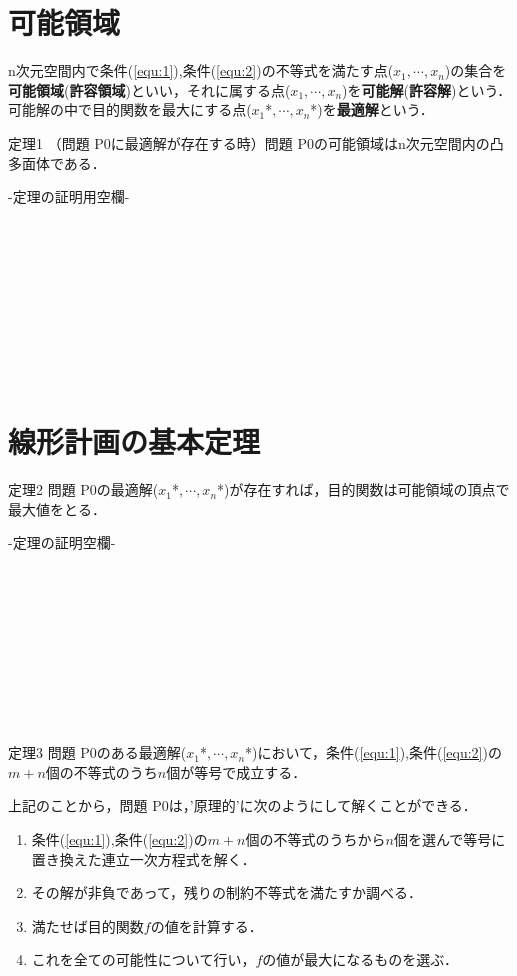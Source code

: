 \documentclass[dvipdfmx,autodetect-engine]{jsarticle}
\newcommand{\Conref}[1]{条件(\ref{equ:#1})}
\begin{document}
\section{可能領域}
n次元空間内で\Conref{1},\Conref{2}の不等式を満たす点($x_{1},\cdots,x_{n}$)の集合を\textbf{可能領域}(\textbf{許容領域})といい，それに属する点($x_{1},\cdots,x_{n}$)を\textbf{可能解}(\textbf{許容解})という．可能解の中で目的関数を最大にする点($x_{1}$*$,\cdots,x_{n}$*)を\textbf{最適解}という．
\begin{itembox}[l]{定理1}
（問題 P0に最適解が存在する時）問題 P0の可能領域はn次元空間内の凸多面体である．
\end{itembox}
-定理の証明用空欄-
\\
\\
\\
\\
\\
\\
\\
\\
\\
\\

\section{線形計画の基本定理}
\begin{itembox}[l]{定理2}
問題 P0の最適解($x_{1}$*$,\cdots,x_{n}$*)が存在すれば，目的関数は可能領域の頂点で最大値をとる．
\end{itembox}
-定理の証明空欄-
\\
\\
\\
\\
\\
\\
\\
\\
\\
\\

\begin{itembox}[l]{定理3}
問題 P0のある最適解($x_{1}$*$,\cdots,x_{n}$*)において，\Conref{1},\Conref{2}の$m+n$個の不等式のうち$n$個が等号で成立する．
\end{itembox}

上記のことから，問題 P0は，'原理的'に次のようにして解くことができる．

\begin{enumerate}
\item \Conref{1},\Conref{2}の$m+n$個の不等式のうちから$n$個を選んで等号に置き換えた連立一次方程式を解く．
\item その解が非負であって，残りの制約不等式を満たすか調べる．
\item 満たせば目的関数$f$の値を計算する．
\item これを全ての可能性について行い，$f$の値が最大になるものを選ぶ．
\end{enumerate}
\end{document}
